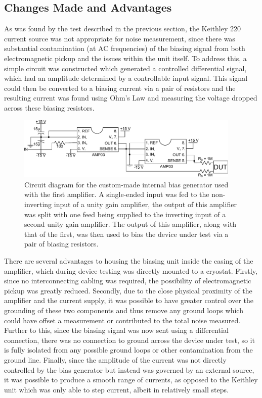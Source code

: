 \subsection{Changes Made and Advantages} \label{ssec:RTD_bias_changes&advantages}
As was found by the test described in the previous section, the Keithley 220 current source was not appropriate for noise measurement, since there was substantial contamination (at AC frequencies) of the biasing signal from both electromagnetic pickup and the issues within the unit itself. To address this, a simple circuit was constructed which generated a controlled differential signal, which had an amplitude determined by a controllable input signal. This signal could then be converted to a biasing current via a pair of resistors and the resulting current was found using Ohm's Law and measuring the voltage dropped across these biasing resistors.
\begin{figure}[t]
\begin{center}
\includegraphics[width = 0.95\textwidth]{figures/RTD_bias}
\caption[Internal bias generator used with initial amplifier]{Circuit diagram for the custom-made internal bias generator used with the first amplifier. A single-ended input was fed to the non-inverting input of a unity gain amplifier, the output of this amplifier was split with one feed being supplied to the inverting input of a second unity gain amplifier. The output of this amplifier, along with that of the first, was then used to bias the device under test via a pair of biasing resistors.}
\label{fig:RTD_bias}
\end{center}
\end{figure}
\par 
There are several advantages to housing the biasing unit inside the casing of the amplifier, which during device testing was directly mounted to a cryostat. Firstly, since no interconnecting cabling was required, the possibility of electromagnetic pickup was greatly reduced. Secondly, due to the close physical proximity of the amplifier and the current supply, it was possible to have greater control over the grounding of these two components and thus remove any ground loops which could have offset a measurement or contributed to the total noise measured. Further to this, since the biasing signal was now sent using a differential connection, there was no connection to ground across the device under test, so it is fully isolated from any possible ground loops or other contamination from the ground line. Finally, since the amplitude of the current was not directly controlled by the bias generator but instead was governed by an external source, it was possible to produce a smooth range of currents, as opposed to the Keithley unit which was only able to step current, albeit in relatively small steps.
